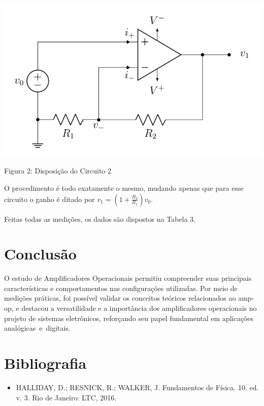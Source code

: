 \documentclass[a4 paper]{article}
\newcommand{\parag}{\hspace{30pt}}
\begin{document}
\begin{table}[h]
\centering
\includegraphics[scale=0.4]{figuras/circuito2}
\end{table}
\begin{center}
Figura 2: Disposição do Circuito 2
\end{center}

O procedimento é todo exatamente o mesmo, mudando apenas que para esse circuito o ganho é ditado por $v_1=(1+\frac{R_2}{R_1})v_0$.

Feitas todas as medições, os dados são dispostos na Tabela 3.







\section{Conclusão}

\parag O estudo de Amplificadores Operacionais permitiu compreender suas principais características e comportamentos nas configurações utilizadas. Por meio de medições práticas, foi possível validar os conceitos teóricos relacionados ao amp-op, e destacou a versatilidade e a importância dos amplificadores operacionais no projeto de sistemas eletrônicos, reforçando seu papel fundamental em aplicações analógicas e digitais.

\section{Bibliografia}
\begin{itemize}
\item HALLIDAY, D.; RESNICK, R.; WALKER, J. Fundamentos de Física. 10. ed. v. 3. Rio de Janeiro: LTC, 2016.
\end{itemize}
\end{document}
